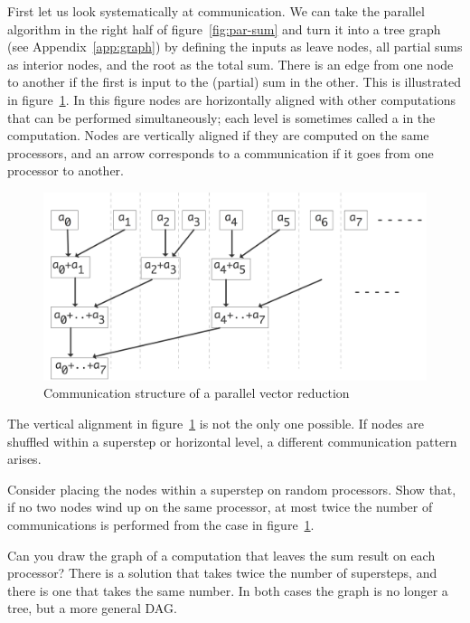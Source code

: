 First let us look systematically at communication. We can take the
parallel algorithm in the right half
of figure~\ref{fig:par-sum} and turn it into a tree graph
(see Appendix~\ref{app:graph}) by defining the inputs as leave nodes,
all partial sums as interior nodes, and the root as the total
sum. There is an edge from one node to another if the first is input
to the (partial) sum in the other. This is illustrated in
figure~\ref{fig:par-sum-graph}. In this figure nodes are horizontally
aligned with other computations that can be performed simultaneously;
each level is sometimes called a  in the computation.
Nodes are vertically aligned if they are computed on the same
processors, and an arrow corresponds to a communication if it goes
from one processor to another. 
\begin{figure}[ht]
  \includegraphics[scale=.13]{graphics/parallel-sum-graph}
  \caption{Communication structure of a parallel vector reduction}
  \label{fig:par-sum-graph}
\end{figure}
The vertical alignment in figure~\ref{fig:par-sum-graph} is not the
only one possible. If nodes are shuffled within a superstep or
horizontal level, a different communication pattern arises.
\begin{exercise}
  Consider placing the nodes within a superstep on random
  processors. Show that, if no two nodes wind up on the same
  processor, at most twice the number of communications is performed
  from the case in figure~\ref{fig:par-sum-graph}.
\end{exercise}

\begin{exercise}
  Can you draw the graph of a computation that leaves the sum result
  on each processor? There is a solution that takes twice the number
  of supersteps, and there is one that takes the same number. In both
  cases the graph is no longer a tree, but a more general \ac{DAG}.
\end{exercise}


